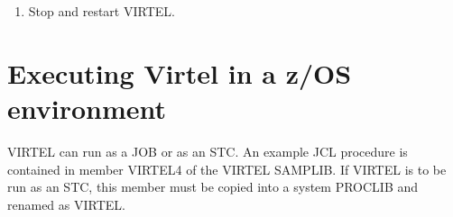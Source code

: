 \documentclass[letterpaper,10pt,english]{sphinxmanual}
\begin{document}
\begin{enumerate}
\item {} 
Stop and restart VIRTEL.

\end{enumerate}

\newpage

\newpage


\section{Executing Virtel in a z/OS environment}
\label{\detokenize{Installation_Guide:executing-virtel-in-a-z-os-environment}}
VIRTEL can run as a JOB or as an STC. An example JCL procedure is contained in member VIRTEL4 of the VIRTEL SAMPLIB. If VIRTEL is to be run as an STC, this member must be copied into a system PROCLIB and renamed as VIRTEL.
\end{document}
